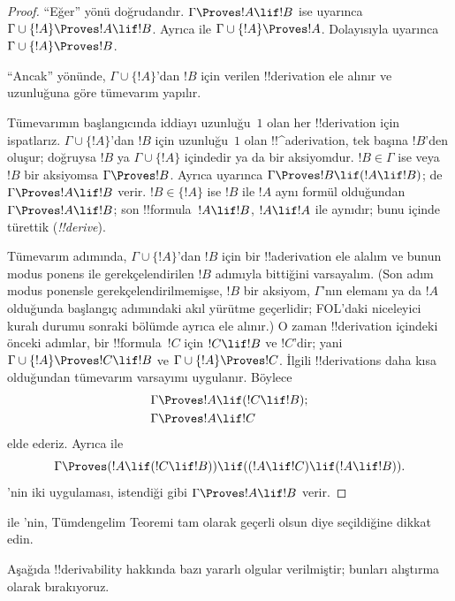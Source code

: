 \begin{proof}
``Eğer'' yönü doğrudandır. $\Gamma \Proves !A \lif !B$ ise
 uyarınca $\Gamma \cup \{!A\} \Proves
!A \lif !B$. Ayrıca  ile
$\Gamma \cup \{!A\} \Proves !A$. Dolayısıyla  uyarınca
$\Gamma \cup \{!A\} \Proves !B$.

``Ancak'' yönünde, $\Gamma \cup \{!A\}$'dan $!B$ için verilen
!!{derivation} ele alınır ve uzunluğuna göre tümevarım yapılır.

Tümevarımın başlangıcında iddiayı uzunluğu~$1$ olan her !!{derivation} için
ispatlarız. $\Gamma \cup \{!A\}$'dan $!B$ için uzunluğu~$1$ olan
!!^a{derivation}, tek başına $!B$'den oluşur; doğruysa $!B$ ya
$\Gamma \cup \{!A\}$ içindedir ya da bir aksiyomdur. $!B \in \Gamma$ ise
veya $!B$ bir aksiyomsa $\Gamma \Proves !B$. Ayrıca
 uyarınca $\Gamma \Proves !B \lif (!A \lif !B)$;
 de $\Gamma \Proves !A \lif !B$ verir. $!B \in \{!A\}$
ise $!B$ ile $!A$ aynı formül olduğundan $\Gamma \Proves !A \lif !B$;
son !!{formula}~$!A \lif !B$,
$!A \lif !A$ ile aynıdır; bunu  içinde
türettik (\emph{!!{derive}}).

Tümevarım adımında, $\Gamma \cup \{!A\}$'dan $!B$ için bir
!!a{derivation} ele alalım ve bunun modus ponens ile gerekçelendirilen $!B$
adımıyla bittiğini varsayalım. (Son adım modus ponensle gerekçelendirilmemişse,
$!B$ bir aksiyom, $\Gamma$'nın elemanı ya da $!A$ olduğunda başlangıç
adımındaki akıl yürütme geçerlidir; FOL'daki niceleyici kuralı durumu sonraki
bölümde ayrıca ele alınır.) O zaman !!{derivation}
içindeki önceki adımlar, bir
!!{formula}~$!C$ için $!C \lif !B$ ve $!C$'dir; yani
$\Gamma \cup \{!A\} \Proves !C \lif !B$ ve
$\Gamma \cup \{!A\} \Proves !C$. İlgili !!{derivation}s daha kısa
olduğundan tümevarım varsayımı uygulanır. Böylece
\begin{align*}
  & \Gamma \Proves !A \lif (!C \lif !B); \\
  & \Gamma \Proves !A \lif !C
\end{align*}
elde ederiz. Ayrıca  ile
\[
\Gamma \Proves (!A \lif (!C \lif !B)) \lif
((!A\lif !C) \lif (!A \lif !B)).
\]
'nin iki uygulaması, istendiği gibi
$\Gamma \Proves !A \lif !B$ verir.
\end{proof}

 ile 'nin, Tümdengelim Teoremi tam
olarak geçerli olsun diye seçildiğine dikkat edin.

Aşağıda !!{derivability} hakkında bazı yararlı olgular verilmiştir; bunları
alıştırma olarak bırakıyoruz.

